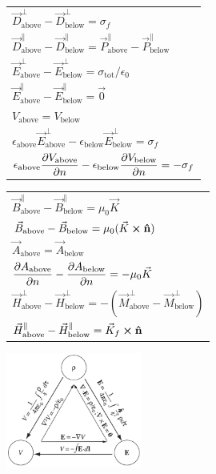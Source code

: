 \documentclass{article}
\newcommand{\ds}{\displaystyle}
\newcommand{\formbox}[2]{\begin{center} \begin{tcolorbox}[title = #1, boxrule=2pt,arc=3.4pt,boxsep=0mm] #2\end{tcolorbox}\end{center}}
\begin{document}
\begin{multicols*}{2}
{    }
    \formbox{Boundary Conditions in Electrostatics}{
        {\renewcommand{\arraystretch}{1.75}%
        \begin{tabular}{ l }
            $\vec{D}_{\text{above}}^{\perp} - \vec{D}_{\text{below}}^{\perp}  = \sigma_f$\\
            $\vec{D}_{\text{above}}^{\parallel} - \vec{D}_{\text{below}}^{\parallel} = \vec{P}_{\text{above}}^{\parallel} - \vec{P}_{\text{below}}^{\parallel}$\\
            $\vec{E}_{\text{above}}^{\perp} - \vec{E}_{\text{below}}^{\perp}  = \sigma_{\text{tot}}/\epsilon_0$\\
            $\vec{E}_{\text{above}}^{\parallel} - \vec{E}_{\text{below}}^{\parallel}  = \vec{0}$\\
            $V_\text{above} = V_\text{below}$\\
            $\epsilon_\text{above}\vec{E}_\text{above}^\perp - \epsilon_\text{below}\vec{E}_\text{below}^\perp = \sigma_f$\\
            $\ds \epsilon_\text{above}\pdv{V_\text{above}}{n} - \epsilon_\text{below}\pdv{V_\text{below}}{n} = -\sigma_f$
        \end{tabular}}
    }
    \formbox{Boundary Conditions in Magnetostatics}{
        {\renewcommand{\arraystretch}{1.75}%
        \begin{tabular}{ l }
            $\vec{B}_\text{above}^\parallel - \vec{B}_\text{below}^\parallel = \mu_0\vec{K}$\\
            $\vec{B}_\text{above} - \vec{B}_\text{below} = \mu_0(\vec{K}\cross\vu{n})$\\
            $\vec{A}_\text{above} = \vec{A}_\text{below}$\\
            $\ds \pdv{A_\text{above}}{n} - \pdv{A_\text{below}}{n} = -\mu_0\vec{K}$\\
            $\vec{H}_\text{above}^\perp - \vec{H}_\text{below}^\perp = - (\vec{M}_\text{above}^\perp - \vec{M}_\text{below}^\perp) $\\
            $\vec{H}_\text{above}^\parallel - \vec{H}_\text{below}^\parallel = \vec{K}_f \cross \vu{n}$
        \end{tabular}}
    }
    \formbox{Triangles}{
        \begin{center}
            \includegraphics[height=3.8cm]{em-triangle.png}

\end{center}}
\end{multicols*}
\end{document}

